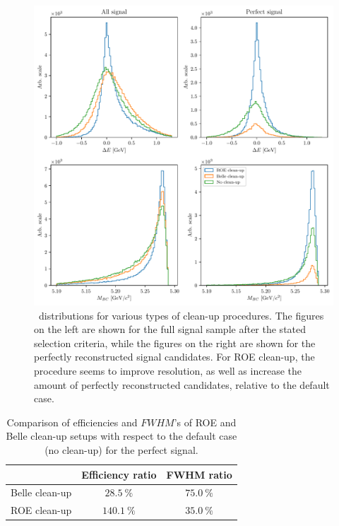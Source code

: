 \begin{figure}[H]
	\centering
	\captionsetup{width=0.8\linewidth}
	\includegraphics[width=\linewidth]{fig/roe_opt}
	\caption{\vars~distributions for various types of clean-up procedures. The figures on the left are shown for the full signal sample after the stated selection criteria, while the figures on the right are shown for the perfectly reconstructed signal candidates. For ROE clean-up, the procedure seems to improve resolution, as well as increase the amount of perfectly reconstructed candidates, relative to the default case.}
	\label{fig:roeopt}
\end{figure}

\begin{table}[H]
	\centering
	\begin{tabular}{c|c|c}
		& Efficiency ratio & FWHM ratio \\
		\toprule
		Belle clean-up & $28.5~\%$  & $75.0~\%$  \\
		ROE clean-up & $140.1~\%$ & $35.0~\%$ \\
		\bottomrule
	\end{tabular}
	\captionsetup{width=.8\linewidth}
	\caption{Comparison of efficiencies and $FWHM$'s of ROE and Belle clean-up setups with respect to the default case (no clean-up) for the perfect signal.}
	\label{tab:roeeff}
\end{table}

